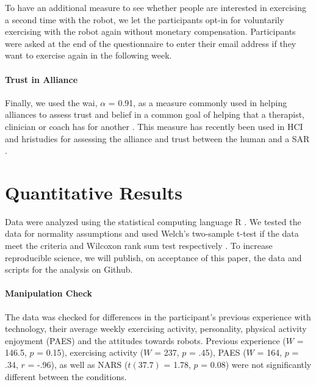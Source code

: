 \documentclass[twocolumn]{svjour3}          %
\begin{document}
To have an additional measure to see whether people are interested in
exercising a second time with the robot, we let the participants opt-in
for voluntarily exercising with the robot again without monetary
compensation. Participants were asked at the end of the questionnaire to
enter their email address if they want to exercise again in the
following week.

\hypertarget{alliance-and-trust-1}{%
\paragraph{Trust in Alliance}\label{alliance-and-trust-1}}

Finally, we used the \gls{wai}, \(\alpha\) = 0.91,
as a measure commonly used in helping alliances to assess trust and
belief in a common goal of helping that a therapist, clinician or coach
has for another \autocite{horvath1989development}. This measure has
recently been used in HCI and \gls{hri}studies for assessing the alliance
and trust between the human and a SAR
\autocite{bickmore2005establishing,kidd2008robots}.

\hypertarget{results}{%
\section{\texorpdfstring{Quantitative Results
\label{adaptation:sec:results}}{Results }}\label{results}}

Data were analyzed using the statistical computing language R
\autocite{R2013}. We tested the data for normality assumptions and used
Welch's two-sample t-test if the data meet the criteria and Wilcoxon
rank sum test respectively
\autocite{welch1947generalization,wilcoxon1945individual}. To increase
reproducible science, we will publish, on acceptance of this paper, the
data and scripts for the analysis on Github.

\hypertarget{manipulation-check}{%
\paragraph{Manipulation Check}\label{manipulation-check}}

The data was checked for differences in the participant's previous
experience with technology, their average weekly exercising activity, personality, physical activity enjoyment (PAES) and
the attitudes towards robots. Previous experience (\(W\) = 146.5, \(p\)
= 0.15), exercising activity (\(W\) = 237, \(p\) = .45), PAES (\(W\) = 164, \(p\) = .34, \(r\) = -.96), as well as NARS
(\(t(37.7)\) = 1.78, \(p\) = 0.08) were not significantly different
between the conditions.
\end{document}
